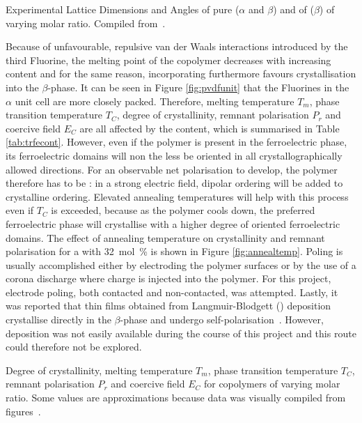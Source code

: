 \begin{table}
\centering
\caption{Experimental Lattice Dimensions and Angles of pure \pvdf{} ($\alpha$ and $\beta$) and of \pvfe{} ($\beta$) of varying molar ratio. Compiled from~\cite[p. 810]{encyclopedia}.}
\label{tab:pvdflat}

\end{table}
Because of unfavourable, repulsive van der Waals interactions introduced by the third Fluorine, the melting point of the copolymer decreases with increasing \trfe{} content and for the same reason, incorporating \trfe{} furthermore favours crystallisation into the $\beta$-phase. It can be seen in Figure \ref{fig:pvdfunit} that the Fluorines in the $\alpha$ unit cell are more closely packed. Therefore, melting temperature $T_m$, phase transition temperature $T_C$, degree of crystallinity, remnant polarisation $P_r$ and coercive field $E_C$ are all affected by the \trfe{} content, which is summarised in Table \ref{tab:trfecont}. However, even if the polymer is present in the ferroelectric phase, its ferroelectric domains will non the less be oriented in all crystallographically allowed directions. For an observable net polarisation to develop, the polymer therefore has to be : in a strong electric field, dipolar ordering will be added to crystalline ordering. Elevated annealing temperatures will help with this process even if $T_C$ is exceeded, because as the polymer cools down, the preferred ferroelectric phase will crystallise with a higher degree of oriented ferroelectric domains. The effect of annealing temperature on crystallinity and remnant polarisation for a \pvfe{} with \SI{32}{\mole\percent} \trfe{} is shown in Figure \ref{fig:annealtemp}. Poling is usually accomplished either by electroding the polymer surfaces or by the use of a corona discharge where charge is injected into the polymer. For this project, electrode poling, both contacted and non-contacted, was attempted. Lastly, it was reported that \pvdf{} thin films obtained from Langmuir-Blodgett (\lb{}) deposition crystallise directly in the $\beta$-phase and undergo self-polarisation~\cite{chen_lbpvdf,kliem_lbpvdf}. However, \lb{} deposition was not easily available during the course of this project and this route could therefore not be explored.
\begin{table}
\centering
\caption{Degree of crystallinity, melting temperature $T_m$, phase transition temperature $T_C$, remnant polarisation $P_r$ and coercive field $E_C$ for \pvfe{} copolymers of varying molar ratio. Some values are approximations because data was visually compiled from figures~\cite[pp. 812 f.]{encyclopedia}.}
\label{tab:trfecont}

\end{table}

